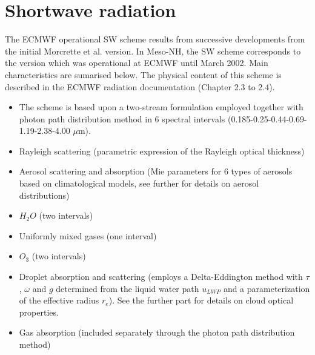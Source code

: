 \section{Shortwave radiation}

The ECMWF operational SW scheme results from successive developments from the initial Morcrette et al. version. In Meso-NH, the SW scheme corresponds to the version which was operational at ECMWF until March 2002. Main characteristics are sumarised below. The physical content of this scheme is described in the ECMWF radiation documentation (Chapter 2.3 to 2.4). 


\begin{itemize}

               \item The scheme is based upon a two-stream formulation employed together with photon path
                   distribution method \citep{Fouquart1980} in 6 spectral intervals
                   (0.185-0.25-0.44-0.69-1.19-2.38-4.00 $\mu$m).\footnotemark 
%


               \item Rayleigh scattering (parametric expression of the Rayleigh optical thickness)
               \item Aerosol scattering and absorption (Mie parameters for 6 types of aerosols based on climatological models, see further for details on aerosol distributions)
               \item $H_{2}O$ (two intervals)
               \item Uniformly mixed gases (one interval)
               \item $O_{3}$ (two intervals)
\end{itemize}



\begin{itemize}
            \item Droplet absorption and scattering (employs a Delta-Eddington
method with $\tau$, $\omega$ and $g$ determined from the liquid water path
$u_{LWP}$ and a parameterization of the effective radius $r_{e}$). See the further part for details on cloud optical properties.
            \item Gas absorption (included separately through the photon path distribution method)
\end{itemize}


